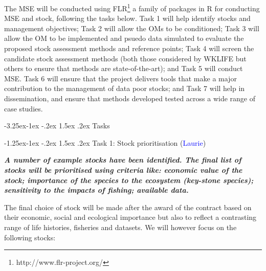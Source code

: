 \documentclass[a4paper, 10pt]{article}
\makeatletter
\newcommand{\laurie}{\textcolor{blue}}
\renewcommand{\subsubsection}{\@startsection{subsubsection}{3}{\z@}%
  {-1.25ex\@plus -1ex \@minus -.2ex}%
  {1.5ex \@plus .2ex}%
  {\normalfont\slshape}}
\renewcommand{\subsection}{\@startsection{subsection}{2}{\z@}%
  {-3.25ex\@plus -1ex \@minus -.2ex}%
  {1.5ex \@plus .2ex}%
  {\normalfont\bfseries\slshape}}
\makeatother
\begin{document}
The MSE will be conducted using FLR\footnote{http://www.flr-project.org/} \citep{kell2007flr} a family of packages in R for conducting MSE and stock, following the tasks below.
Task 1 will help identify stocks and management objectives; Task 2 will allow the OMs to be conditioned; Task 3 will allow the OM to be implemented and psuedo data simulated to evaluate the proposed stock assessment methods and reference points; Task 4 will screen the candidate stock assessment methods (both those considered by WKLIFE but others to ensure that methods are state-of-the-art); and Task 5 will conduct MSE. Task 6 will ensure that the project delivers tools that make a major contribution to the management of data poor stocks; and Task 7 will help in dissemination, and ensure that methods developed tested across a wide range of case studies. 

\newpage\subsection{Tasks}

\subsubsection{Task 1: Stock prioritisation (\laurie{Laurie})}

\textit{\textbf{A number of example stocks have been identified. The final list of stocks will be prioritised using criteria like: economic value of the stock; importance of the species to the ecosystem (key-stone species); sensitivity to the impacts of fishing; available data.}}

The final choice of stock will be made after the award of the contract based on their economic, social and ecological importance but also to reflect a contrasting range of life histories, fisheries and datasets. We will however focus on the following stocks:
\end{document}

